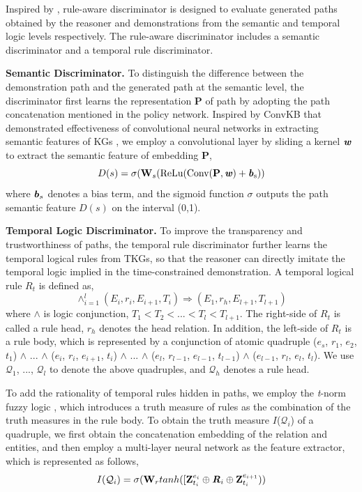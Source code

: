 \documentclass[sigconf,natbib=true]{acmart}
\begin{document}
Inspired by \cite{DIVINE}, rule-aware discriminator is designed to evaluate  generated paths obtained by the reasoner and demonstrations from the semantic and temporal logic levels respectively.  The rule-aware discriminator includes a semantic discriminator and a temporal rule discriminator.

\textbf{Semantic Discriminator.} To distinguish the difference between the demonstration path and the generated path at the semantic level, the discriminator first learns the representation \textbf{P} of  path by adopting the path concatenation 
 mentioned in the policy network. Inspired by ConvKB that demonstrated effectiveness of convolutional neural networks in extracting semantic features of KGs \cite{ConvKB}, we employ a convolutional layer by sliding a kernel $\textbf{\emph{w}}$ to extract the semantic feature of embedding \textbf{P},
 \begin{equation}
	D(s) = \sigma (\textbf{W}_s(\rm ReLu (Conv(\textbf{P}, \textbf{\emph{w}}) + \textbf{\emph{b}}_s))
\end{equation}
where $\textbf{\emph{b}}_s$ denotes a bias term, and the sigmoid function $\sigma$ outputs the path semantic feature $D(s)$ on the interval (0,1). 

\textbf{Temporal Logic Discriminator.} 
To improve the transparency and trustworthiness of paths, the temporal rule discriminator further learns the temporal logical rules from TKGs, so that the reasoner can directly imitate the temporal logic implied in the time-constrained demonstration. %
A temporal logical rule $R_t$ is defined as, 
 \begin{equation}
	\wedge_{i=1}^{l}(E_i, r_i, E_{i+1}, T_i) \Rightarrow (E_1, r_h, E_{l+1}, T_{l+1})  
\end{equation}
where $\wedge$ is logic conjunction, $T_1<T_2<...<T_l<T_{l+1}$. The right-side of $R_t$ is called a rule head, $r_h$ denotes the head relation. In addition, the left-side of $R_t$ is  a rule body, which is represented by a conjunction of atomic quadruple ($e_s$, $r_1$, $e_2$, $t_1$) $\wedge$ ... $\wedge$ ($e_i$, $r_i$, $e_{i+1}$, $t_i$) $\wedge$ ... $\wedge$ ($e_l$, $r_{l-1}$, $e_{l-1}$, $t_{l-1}$) $\wedge$ ($e_{l-1}$, $r_{l}$, $e_{l}$, $t_{l}$). We use $\mathcal{Q}_1$, ..., $\mathcal{Q}_l$ to denote the above quadruples, and $\mathcal{Q}_h$ denotes a rule head.


To add the rationality of temporal rules hidden in paths, we employ the \emph{t}-norm fuzzy logic \cite{fuzzylogic}, which introduces a truth measure of rules as the combination of the truth measures in the rule body.  To obtain the truth measure  $I$($\mathcal{Q}_i$) of a  quadruple, we first obtain the concatenation embedding of the relation and entities, and then employ a multi-layer neural network as the feature extractor, which is represented as follows, 
 \begin{equation}
I(\mathcal{Q}_i) = \sigma(\textbf{W}_{r}tanh([\textbf{Z}_{t_{i}}^{e_i} \oplus\textbf{\emph{R}}_{i}\oplus \textbf{Z}_{t_{i}}^{e_{i+1}}))
\end{equation}
\end{document}
